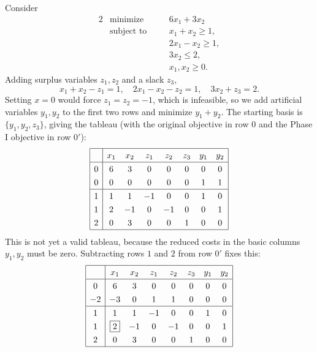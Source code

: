 \begin{example}
    Consider
    \begin{alignat*}{2}
        & \text{minimize} \quad && 6x_1 + 3x_2 \\
        & \text{subject to} \quad && x_1 + x_2 \geq 1, \\
        & && 2x_1 - x_2 \geq 1, \\
        & && 3x_2 \leq 2, \\
        & && x_1, x_2 \geq 0.
    \end{alignat*}
    Adding surplus variables $z_1, z_2$ and a slack $z_3$,
    $$
    x_1 + x_2 - z_1 = 1, \quad 2x_1 - x_2 - z_2 = 1, \quad 3x_2 + z_3 = 2.
    $$
    Setting $x = 0$ would force $z_1 = z_2 = -1$, which is infeasible, so we add artificial variables $y_1, y_2$ to the first two rows and minimize $y_1 + y_2$. The starting basis is $\{y_1, y_2, z_3\}$, giving the tableau (with the original objective in row $0$ and the Phase I objective in row $0'$):
    $$
    \arraycolsep=5pt\def\arraystretch{1.3}
    \begin{array}{|c|ccccccc|}\hline
        \multicolumn{1}{|c|}{} & x_1 & x_2 & z_1 & z_2 & z_3 & y_1 & y_2\\\hline
        0 & 6 & 3 & 0 & 0 & 0 & 0 & 0\\
        0 & 0 & 0 & 0 & 0 & 0 & 1 & 1\\\hline
        1 & 1 & 1 & -1 & 0 & 0 & 1 & 0\\
        1 & 2 & -1 & 0 & -1 & 0 & 0 & 1\\
        2 & 0 & 3 & 0 & 0 & 1 & 0 & 0\\\hline
    \end{array}
    $$
    This is not yet a valid tableau, because the reduced costs in the basic columns $y_1, y_2$ must be zero. Subtracting rows $1$ and $2$ from row $0'$ fixes this:
    $$
    \arraycolsep=5pt\def\arraystretch{1.3}
    \begin{array}{|c|ccccccc|}\hline
        \multicolumn{1}{|c|}{} & x_1 & x_2 & z_1 & z_2 & z_3 & y_1 & y_2\\\hline
        0 & 6 & 3 & 0 & 0 & 0 & 0 & 0\\
        -2 & -3 & 0 & 1 & 1 & 0 & 0 & 0\\\hline
        1 & 1 & 1 & -1 & 0 & 0 & 1 & 0\\
        1 & \boxed{2} & -1 & 0 & -1 & 0 & 0 & 1\\
        2 & 0 & 3 & 0 & 0 & 1 & 0 & 0\\\hline
    \end{array}
$$
\end{example}
